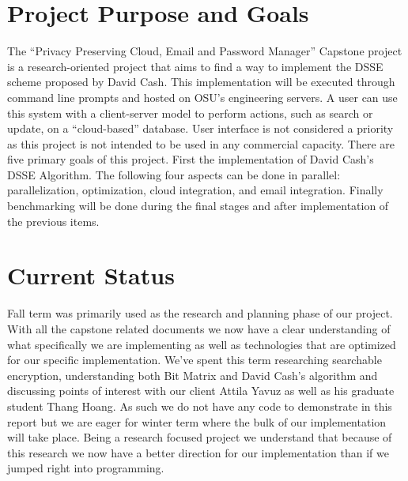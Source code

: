 \documentclass[onecolumn, draftclsnofoot,10pt, compsoc]{IEEEtran}
\begin{document}
\section{Project Purpose and Goals}
The ``Privacy Preserving Cloud, Email and Password Manager'' Capstone project is a research-oriented project that aims
to find a way to implement the DSSE scheme proposed by David Cash. This implementation will be executed through command line prompts and hosted on OSU’s engineering servers. A user can use this system with a client-server model to perform actions, such as search or update, on a ``cloud-based'' database. User interface is not considered a priority as this project is not intended to be used in any commercial capacity. There are five primary goals of this project. First the implementation of David Cash's DSSE Algorithm. The following four aspects can be done in parallel: parallelization, optimization, cloud integration, and email integration. Finally benchmarking will be done during the final stages and after implementation of the previous items.



\section{Current Status}
Fall term was primarily used as the research and planning phase of our project. With all the capstone related documents we now have a clear understanding of what specifically we are implementing as well as technologies that are optimized for our specific implementation. We've spent this term researching searchable encryption, understanding both Bit Matrix and David Cash's algorithm and discussing points of interest with our client Attila Yavuz as well as his graduate student Thang Hoang. As such we do not have any code to demonstrate in this report but we are eager for winter term where the bulk of our implementation will take place. Being a research focused project we understand that because of this research we now have a better direction for our implementation than if we jumped right into programming.

\begin{comment}
Where are we currently?
we've started to research searchable encryption
we have an overall picture of the design
but we need to hash out details
	- sort of what design document was about
    - but we're also a research project, so not so much
we're all eager to start the actual implementation
\end{comment}
\end{document}
